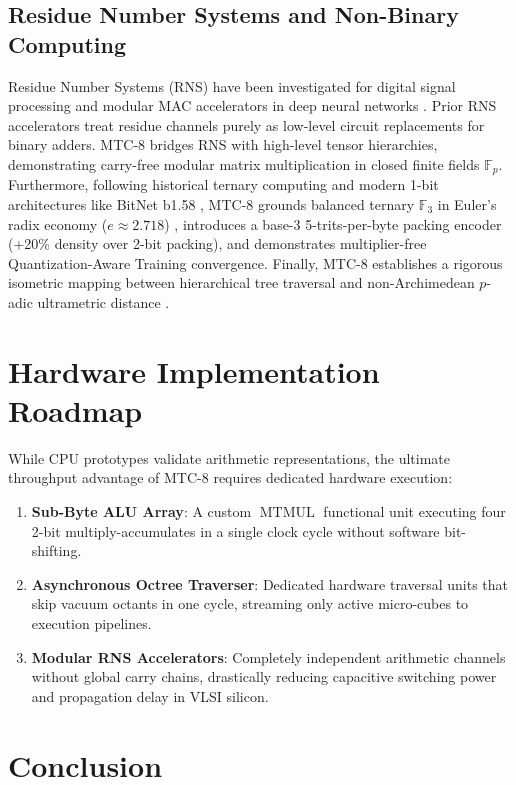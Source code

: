 \documentclass[11pt,a4paper]{article}
\begin{document}
\subsection{Residue Number Systems and Non-Binary Computing}
Residue Number Systems (RNS) have been investigated for digital signal processing and modular MAC accelerators in deep neural networks \cite{omondi2007residue, bajard2020rns, knuth1997art}. Prior RNS accelerators treat residue channels purely as low-level circuit replacements for binary adders. MTC-8 bridges RNS with high-level tensor hierarchies, demonstrating carry-free modular matrix multiplication in closed finite fields $\mathbb{F}_p$.
Furthermore, following historical ternary computing \cite{brusentsov1958setun} and modern 1-bit architectures like BitNet b1.58 \cite{wang2024bitnet}, MTC-8 grounds balanced ternary $\mathbb{F}_3$ in Euler's radix economy ($e \approx 2.718$) \cite{hayes2001third}, introduces a base-3 5-trits-per-byte packing encoder (+20\% density over 2-bit packing), and demonstrates multiplier-free Quantization-Aware Training convergence. Finally, MTC-8 establishes a rigorous isometric mapping between hierarchical tree traversal and non-Archimedean $p$-adic ultrametric distance \cite{khrennikov1997non, murtagh2014thinking}.

\section{Hardware Implementation Roadmap}

While CPU prototypes validate arithmetic representations, the ultimate throughput advantage of MTC-8 requires dedicated hardware execution:
\begin{enumerate}
    \item \textbf{Sub-Byte ALU Array}: A custom $\operatorname{MTMUL}$ functional unit executing four 2-bit multiply-accumulates in a single clock cycle without software bit-shifting.
    \item \textbf{Asynchronous Octree Traverser}: Dedicated hardware traversal units that skip vacuum octants in one cycle, streaming only active micro-cubes to execution pipelines.
    \item \textbf{Modular RNS Accelerators}: Completely independent arithmetic channels without global carry chains, drastically reducing capacitive switching power and propagation delay in VLSI silicon.
\end{enumerate}

\section{Conclusion}
\end{document}
